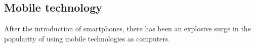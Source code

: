 \subsection{Mobile technology}

After the introduction of smartphones, there has been an explosive surge in the
popularity of using mobile technologies as computers.
\begin{figure}[!ht]
\centering
{}
\subfigure{
}
\end{figure}
